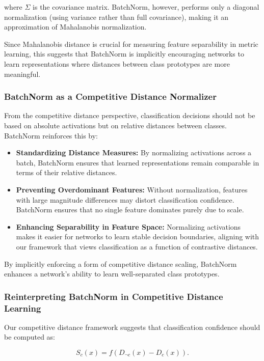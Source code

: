 \documentclass[12pt]{article}
\begin{document}
where \( \Sigma \) is the covariance matrix. BatchNorm, however, performs only a diagonal normalization (using variance rather than full covariance), making it an approximation of Mahalanobis normalization. 

Since Mahalanobis distance is crucial for measuring feature separability in metric learning, this suggests that BatchNorm is implicitly encouraging networks to learn representations where distances between class prototypes are more meaningful.

\subsubsection{BatchNorm as a Competitive Distance Normalizer}

From the competitive distance perspective, classification decisions should not be based on absolute activations but on relative distances between classes. BatchNorm reinforces this by:

\begin{itemize}
    \item \textbf{Standardizing Distance Measures:} By normalizing activations across a batch, BatchNorm ensures that learned representations remain comparable in terms of their relative distances.
    \item \textbf{Preventing Overdominant Features:} Without normalization, features with large magnitude differences may distort classification confidence. BatchNorm ensures that no single feature dominates purely due to scale.
    \item \textbf{Enhancing Separability in Feature Space:} Normalizing activations makes it easier for networks to learn stable decision boundaries, aligning with our framework that views classification as a function of contrastive distances.
\end{itemize}

By implicitly enforcing a form of competitive distance scaling, BatchNorm enhances a network's ability to learn well-separated class prototypes.

\subsubsection{Reinterpreting BatchNorm in Competitive Distance Learning}

Our competitive distance framework suggests that classification confidence should be computed as:

\[
S_c(x) = f(D_{\neg c}(x) - D_c(x)).
\]
\end{document}
